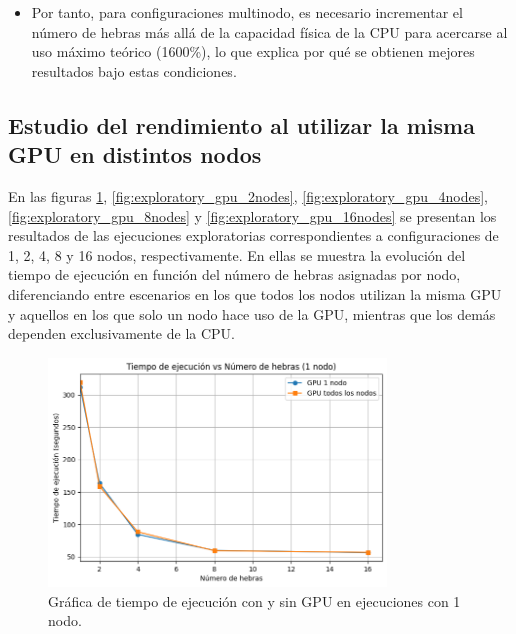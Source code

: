 \begin{itemize}
    \item Por tanto, para configuraciones multinodo, es necesario incrementar el número de hebras más allá de la capacidad física de la CPU para acercarse al uso máximo teórico (1600\%), lo que explica por qué se obtienen mejores resultados bajo estas condiciones.
\end{itemize}

\subsection{Estudio del rendimiento al utilizar la misma GPU en distintos nodos}

En las figuras \ref{fig:exploratory_gpu_1node}, \ref{fig:exploratory_gpu_2nodes}, \ref{fig:exploratory_gpu_4nodes}, \ref{fig:exploratory_gpu_8nodes} y \ref{fig:exploratory_gpu_16nodes} se presentan los resultados de las ejecuciones exploratorias correspondientes a configuraciones de 1, 2, 4, 8 y 16 nodos, respectivamente. En ellas se muestra la evolución del tiempo de ejecución en función del número de hebras asignadas por nodo, diferenciando entre escenarios en los que todos los nodos utilizan la misma GPU y aquellos en los que solo un nodo hace uso de la GPU, mientras que los demás dependen exclusivamente de la CPU.

\begin{figure}[ht]
    \centering
    \includegraphics[width=0.8\textwidth]{imagenes/cap5/exploratory_gpu_1node.png}
    \caption{Gráfica de tiempo de ejecución con y sin GPU en ejecuciones con 1 nodo.}
    \label{fig:exploratory_gpu_1node}
\end{figure}

